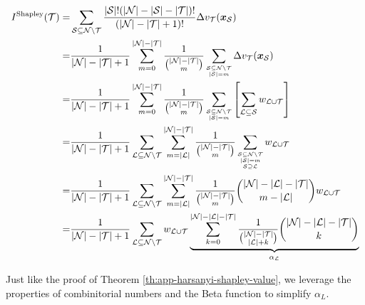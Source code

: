 \begin{small}
\begin{align*}
I^{\textrm{Shapley}}(\mathcal{T}) =& \sum_{\mathcal{S}\subseteq \mathcal{N}\backslash \mathcal{T}}\frac{|\mathcal{S}|!(|\mathcal{N}|-|\mathcal{S}|-|\mathcal{T}|)!}{(|\mathcal{N}|-|\mathcal{T}|+1)!}\Delta v_\mathcal{T}(\boldsymbol{x}_{\mathcal{S}})\\
=& \frac{1}{|\mathcal{N}|-|\mathcal{T}|+1}\sum_{m=0}^{|\mathcal{N}|-|\mathcal{T}|}\frac{1}{\binom{|\mathcal{N}|-|\mathcal{T}|}{m}}\sum_{\scriptsize\substack{\mathcal{S}\subseteq \mathcal{N}\backslash \mathcal{T}\\ |\mathcal{S}|=m}}\Delta v_{\mathcal{T}}(\boldsymbol{x}_{\mathcal{S}})\\
=& \frac{1}{|\mathcal{N}|-|\mathcal{T}|+1}\sum_{m=0}^{|\mathcal{N}|-|\mathcal{T}|}\frac{1}{\binom{|\mathcal{N}|-|\mathcal{T}|}{m}}\sum_{\scriptsize\substack{\mathcal{S}\subseteq \mathcal{N}\backslash \mathcal{T}\\ |\mathcal{S}|=m}}\left[\sum_{\mathcal{L}\subseteq \mathcal{S}} w_{\mathcal{L}\cup \mathcal{T}} \right]\\
=& \frac{1}{|\mathcal{N}|-|\mathcal{T}|+1}\sum_{\mathcal{L}\subseteq \mathcal{N}\backslash \mathcal{T}}\sum_{m=|\mathcal{L}|}^{|\mathcal{N}|-|\mathcal{T}|}\frac{1}{\binom{|\mathcal{N}|-|\mathcal{T}|}{m}}\sum_{\scriptsize\substack{\mathcal{S}\subseteq \mathcal{N}\backslash \mathcal{T}\\|\mathcal{S}|=m\\\mathcal{S}\supseteq \mathcal{L}}} w_{\mathcal{L}\cup \mathcal{T}} \\
=& \frac{1}{|\mathcal{N}|-|\mathcal{T}|+1}\sum_{\mathcal{L}\subseteq \mathcal{N}\backslash \mathcal{T}}\sum_{m=|\mathcal{L}|}^{|\mathcal{N}|-|\mathcal{T}|}\frac{1}{\binom{|\mathcal{N}|-|\mathcal{T}|}{m}}\binom{|\mathcal{N}|-|\mathcal{L}|-|\mathcal{T}|}{m-|\mathcal{L}|} w_{\mathcal{L}\cup \mathcal{T}} \\
=& \frac{1}{|\mathcal{N}|-|\mathcal{T}|+1}\sum_{\mathcal{L}\subseteq \mathcal{N}\backslash \mathcal{T}} w_{\mathcal{L}\cup \mathcal{T}} \underbrace{\sum_{k=0}^{|\mathcal{N}|-|\mathcal{L}|-|\mathcal{T}|}\frac{1}{\binom{|\mathcal{N}|-|\mathcal{T}|}{|\mathcal{L}|+k}}\binom{|\mathcal{N}|-|\mathcal{L}|-|\mathcal{T}|}{k}}_{\alpha_\mathcal{L}}
\end{align*}
\end{small}


Just like the proof of Theorem \ref{th:app-harsanyi-shapley-value}, we leverage the properties of combinitorial numbers and the Beta function to simplify {\small$\alpha_L$}.


